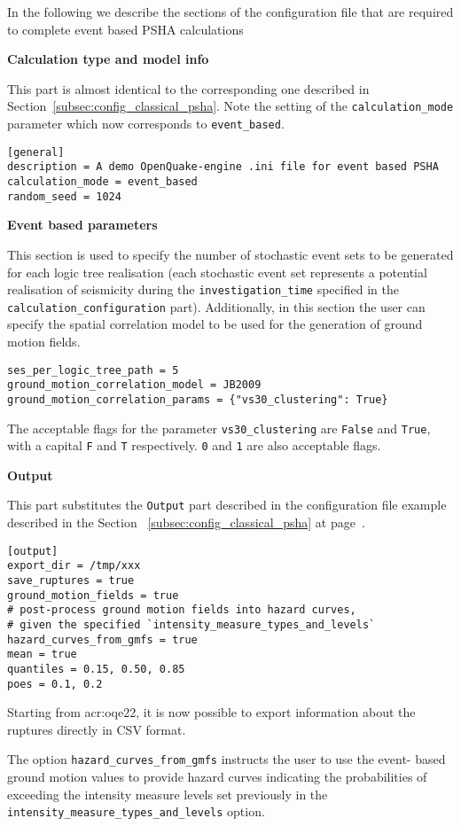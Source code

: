 In the following we describe the sections of the configuration file that are
required to complete event based PSHA calculations


\textbf{Calculation type and model info}

This part is almost identical to the corresponding one described in
Section~\ref{subsec:config_classical_psha}. Note the setting of the
\texttt{calculation\_mode} parameter which now corresponds to
\texttt{event\_based}.

\begin{verbatim}
[general]
description = A demo OpenQuake-engine .ini file for event based PSHA
calculation_mode = event_based
random_seed = 1024
\end{verbatim}

\textbf{Event based parameters}

This section is used to specify the number of stochastic event sets to be
generated for each logic tree realisation (each stochastic event set
represents a potential realisation of seismicity during the
\texttt{investigation\_time} specified in the
\texttt{calculation\_configuration} part). Additionally, in this section the
user can specify the spatial correlation model to be used for the generation
of ground motion fields.

\begin{verbatim}
ses_per_logic_tree_path = 5
ground_motion_correlation_model = JB2009
ground_motion_correlation_params = {"vs30_clustering": True}
\end{verbatim}

The acceptable flags for the parameter \verb+vs30_clustering+ are \verb+False+
and \verb+True+, with a capital \verb+F+ and \verb+T+ respectively. \verb+0+
and \verb+1+ are also acceptable flags.

\textbf{Output}

This part substitutes the \texttt{Output} part described in  the configuration
file example described in the Section~ \ref{subsec:config_classical_psha} at
page~\pageref{subsec:config_classical_psha}.

\begin{verbatim}
[output]
export_dir = /tmp/xxx
save_ruptures = true
ground_motion_fields = true
# post-process ground motion fields into hazard curves,
# given the specified `intensity_measure_types_and_levels`
hazard_curves_from_gmfs = true
mean = true
quantiles = 0.15, 0.50, 0.85
poes = 0.1, 0.2
\end{verbatim}

Starting from \glsdesc{acr:oqe22}, it is now possible to export information
about the ruptures directly in CSV format.

The option \verb=hazard_curves_from_gmfs= instructs the user to use the event-
based ground motion values to provide hazard curves indicating the
probabilities of exceeding the intensity measure levels set previously in the
\verb=intensity_measure_types_and_levels= option.
